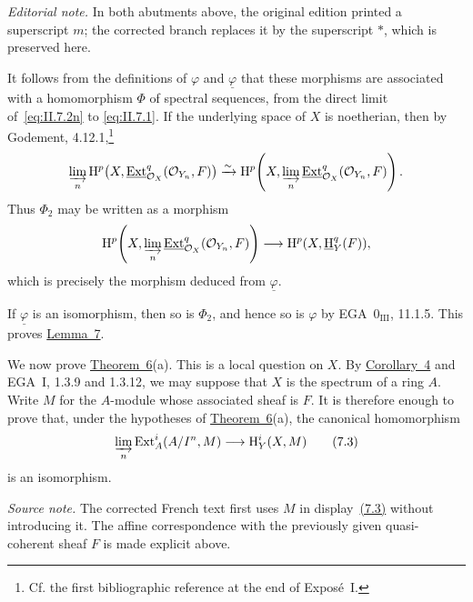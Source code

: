 \noindent\textit{Editorial note.} In both abutments above, the original
edition printed a superscript $m$; the corrected branch replaces it by the
superscript $*$, which is preserved here.

It follows from the definitions of $\varphi$ and $\underline{\varphi}$ that
these morphisms are associated with a homomorphism $\Phi$ of spectral
sequences, from the direct limit of~\eqref{eq:II.7.2n} to
\eqref{eq:II.7.1}. If the underlying space of $X$ is noetherian, then by
Godement, 4.12.1,\footnote{Cf. the first bibliographic reference at the end
of Expos\'e~I.}
\[
  \varinjlim_n
    \mathrm H^p\bigl(X,\mathop{\underline{\mathrm{Ext}}}\nolimits_{\mathcal O_X}^q(\mathcal O_{Y_n},F)\bigr)
  \xrightarrow{\sim}
  \mathrm H^p\!\left(
    X,\varinjlim_n\mathop{\underline{\mathrm{Ext}}}\nolimits_{\mathcal O_X}^q(\mathcal O_{Y_n},F)\right).
\]
Thus $\Phi_2$ may be written as a morphism
\[
  \mathrm H^p\!\left(
    X,\varinjlim_n\mathop{\underline{\mathrm{Ext}}}\nolimits_{\mathcal O_X}^q(\mathcal O_{Y_n},F)\right)
  \longrightarrow \mathrm H^p(X,\mathop{\underline{\mathrm H}}\nolimits_Y^q(F)),
\]
which is precisely the morphism deduced from $\underline{\varphi}$.

If $\underline{\varphi}$ is an isomorphism, then so is
$\Phi_2$, and hence so is $\varphi$ by EGA~$0_{\mathrm{III}}$, 11.1.5.
This proves \hyperref[II.7]{Lemma~7}.

We now prove \hyperref[II.6]{Theorem~6}(a). This is a local question on $X$. By \hyperref[II.4]{Corollary~4}
and EGA~I, 1.3.9 and 1.3.12, we may suppose that $X$ is the spectrum of a
ring $A$. Write $M$ for the $A$-module whose associated sheaf is $F$. It is
therefore enough to prove that, under the hypotheses of \hyperref[II.6]{Theorem~6}(a), the
canonical homomorphism
\begin{equation}
  \varinjlim_n\operatorname{Ext}_A^i(A/I^n,M)
  \longrightarrow \mathrm H_Y^i(X,M)
  \tag{7.3}\label{eq:II.7.3}
\end{equation}
is an isomorphism.

\noindent\textit{Source note.} The corrected French text first uses $M$ in
display~\hyperref[eq:II.7.3]{(7.3)} without introducing it. The affine correspondence with the
previously given quasi-coherent sheaf $F$ is made explicit above.

